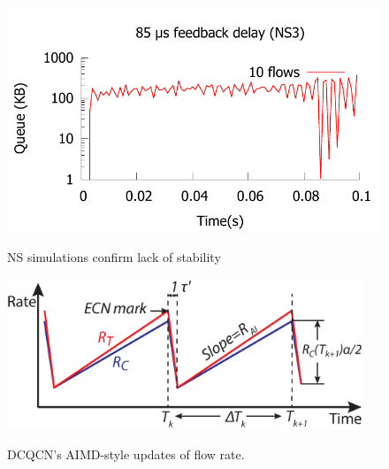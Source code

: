 \begin{figure}[t]
{\begin{minipage}{0.31\textwidth}
\includegraphics[width=0.99\columnwidth]{figures/stable_queue_85_ns.pdf}
\vspace{-2em}
\caption{NS simulations confirm lack of stability}
\label{fig:dcqcn_unstable_ns}

\includegraphics[width=0.95\textwidth]{figures/dcqcn_convergence_brief.eps}
\caption{DCQCN's AIMD-style updates of flow rate.}
\vspace{-1.5em}
\label{fig:dcqcn_convergence}

\end{minipage}
}
\end{figure}


